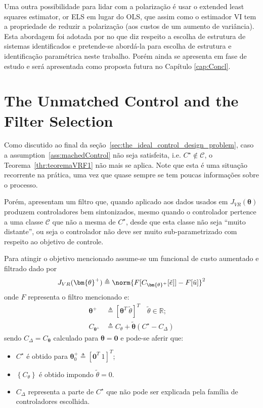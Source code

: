 Uma outra possibilidade para lidar com a polarização é usar o extended least squares estimator, or ELS \citep{aguirre2015,ljung1999} em lugar do OLS, que assim como o estimador VI tem a propriedade de reduzir a polarização (aos custos de um aumento de variância). Esta abordagem foi adotada por \citep{retesNARMAXModelIdentification2019} no que diz respeito a escolha de estrutura de sistemas identificados e pretende-se abordá-la para escolha de estrutura e identificação paramétrica neste trabalho. Porém ainda se apresenta em fase de estudo e será apresentada como proposta futura no Capítulo \ref{cap:Concl}.


\section{The Unmatched Control and the Filter Selection}%
\label{sec:filtro_caso_não_linear}
Como discutido ao final da seção~\ref{sec:the_ideal_control_design_problem}, caso a assumption~\ref{ass:machedControl} não seja satisfeita, i.e. $C^\star \not\in \mathscr{C}$,  o Teorema~\ref{thr:teoremaVRF1} não mais se aplica. Note que esta é uma situação recorrente na prática, uma vez que quase sempre se tem poucas informações sobre o processo.

Porém, \cite{campi2006} apresentam um filtro que, quando aplicado aos dados usados em $J_{VR}(\bm{\theta})$ produzem controladores bem sintonizados, mesmo quando o controlador pertence a uma classe $\mathscr{C}$ que não a mesma de $C^\star$, desde que esta classe não seja ``muito distante'', ou seja o controlador não deve ser muito sub-parametrizado com respeito ao objetivo de controle.

Para atingir o objetivo mencionado assume-se um funcional de custo aumentado e filtrado dado por
\begin{equation}
   J_{VR}(\bm{\theta}^{+}) \triangleq \norm{F[C_{\bm{\theta}^{+}}[\tilde{e}]] - F[\tilde{u}]}^2
\label{eq:JVRplus}
\end{equation}
onde $F$ representa o filtro mencionado e:
\begin{align}
   \bm{\theta}^+ &\triangleq  [\bm{\theta}^{T} \ \tilde{\theta} ]^T \quad \tilde{\theta} \in \mathbb{R} ; \\
   C_{\bm{\theta}^+} &\triangleq C_{\theta}+\tilde{\bm{\theta}}\left(C^\star-C_\Delta\right)
\end{align}
sendo $C_\Delta=C_{\bm{\theta}}$ calculado para $\bm{\theta}=\bm{0}$ e pode-se aferir que:
\begin{itemize}
   \setlength\itemsep{0.1pt}
   \renewcommand{\labelitemi}{--}
   \item $C^\star$ é obtido para $\bm{\theta}_0^+ \triangleq [\bm{0}^T\ 1]^T$;
   \item $\left\{C_{\theta}\right\}$ é obtido impondo $\tilde{\theta} = 0$.
   \item $C_\Delta$ representa a parte de $C^\star$ que não pode ser explicada pela família de controladores escolhida.
\end{itemize}

